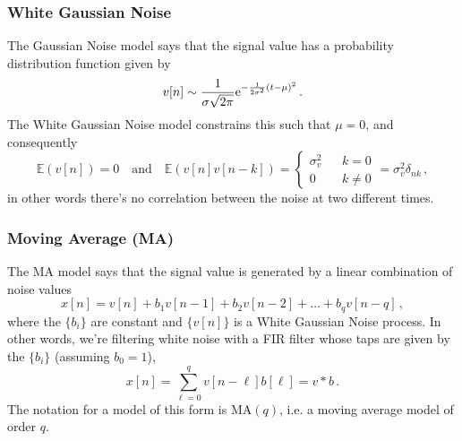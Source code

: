 \subsubsection{White Gaussian Noise}
%
The Gaussian Noise model says that the signal value
has a probability distribution function given by
%
\begin{displaymath}
  v[n] \sim \frac{1}{\sigma\sqrt{2\pi}}\mathrm{e}^{-\frac{1}{2\sigma^2}(t-\mu)^2} \,.
\end{displaymath}
%
The White Gaussian Noise model constrains this such that $\mu = 0$, and
consequently
%
\begin{displaymath}
  \mathbb{E}(v[n]) = 0 \quad\mathrm{and}\quad
  \mathbb{E}(v[n]v[n-k]) = \left\{\begin{array}{ccl}
  \sigma_v^2 & & k = 0 \\
  0 & & k \neq 0
  \end{array}\right. = \sigma_v^2\delta_{nk} \,,
\end{displaymath}
%
in other words there's no correlation between the noise at two different
times.

\subsubsection{Moving Average (MA)}
%
The MA model says that the signal value is generated by a linear
combination of noise values
%
\begin{displaymath}
  x[n] = v[n] + b_1v[n-1] + b_2v[n-2] + \hdots + b_qv[n-q] \,,
\end{displaymath}
%
where the $\{b_i\}$ are constant and $\{v[n]\}$ is a White Gaussian
Noise process. In other words, we're filtering white noise with a
FIR filter whose taps are given by the $\{b_i\}$ (assuming $b_0 = 1$),
%
\begin{displaymath}
  x[n] = \sum_{\ell=0}^q v[n-\ell]b[\ell] = v * b \,.
\end{displaymath}
%
The notation for a model of this form is MA$(q)$, i.e. a moving average
model of order $q$.

